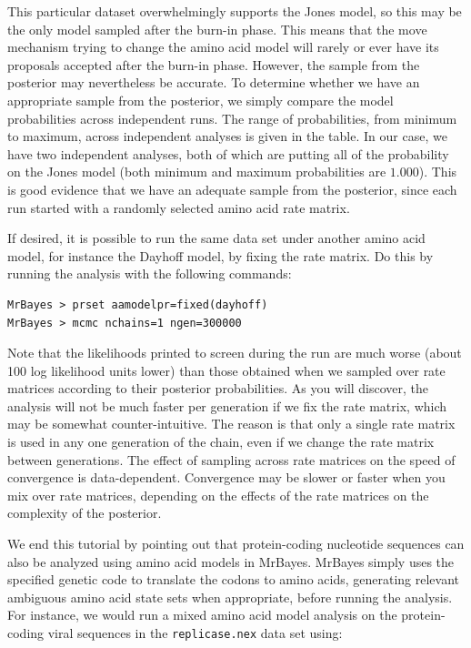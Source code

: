 \documentclass[12pt]{book}
\newcommand{\ttt}[1]{\texttt{#1}}
\begin{document}
This particular dataset overwhelmingly supports the Jones model, so this may be the only model
sampled after the burn-in phase. This means that the move mechanism trying to change the amino acid
model will rarely or ever have its proposals accepted after the burn-in phase. However, the sample
from the posterior may nevertheless be accurate. To determine whether we have an appropriate sample
from the posterior, we simply compare the model probabilities across independent runs. The range of
probabilities, from minimum to maximum, across independent analyses is given in the table. In our
case, we have two independent analyses, both of which are putting all of the probability on the
Jones model (both minimum and maximum probabilities are $1.000$). This is good evidence that we
have an adequate sample from the posterior, since each run started with a randomly selected amino
acid rate matrix.

If desired, it is possible to run the same data set under another amino acid model, for instance
the Dayhoff model, by fixing the rate matrix. Do this by running the analysis with the following
commands:

\begin{singlespacing}
\footnotesize
\begin{verbatim}
MrBayes > prset aamodelpr=fixed(dayhoff)
MrBayes > mcmc nchains=1 ngen=300000
\end{verbatim}
\normalsize
\end{singlespacing}

Note that the likelihoods printed to screen during the run are much worse (about 100 log likelihood
units lower) than those obtained when we sampled over rate matrices according to their posterior
probabilities. As you will discover, the analysis will not be much faster per generation if we fix
the rate matrix, which may be somewhat counter-intuitive. The reason is that only a single rate
matrix is used in any one generation of the chain, even if we change the rate matrix between
generations. The effect of sampling across rate matrices on the speed of convergence is
data-dependent. Convergence may be slower or faster when you mix over rate matrices, depending on
the effects of the rate matrices on the complexity of the posterior.

We end this tutorial by pointing out that protein-coding nucleotide sequences can also be analyzed
using amino acid models in MrBayes. MrBayes simply uses the specified genetic code to translate the
codons to amino acids, generating relevant ambiguous amino acid state sets when appropriate, before
running the analysis. For instance, we would run a mixed amino acid model analysis on the
protein-coding viral sequences in the \ttt{replicase.nex} data set using:
\end{document}
